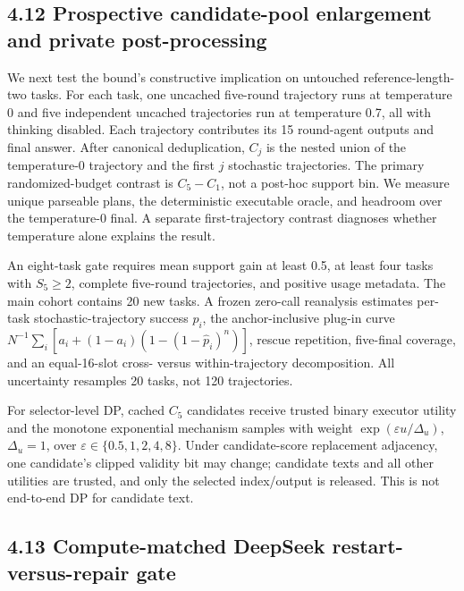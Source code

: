 \documentclass{article}
\begin{document}
\subsection{4.12 Prospective candidate-pool enlargement and private post-processing}

We next test the bound's constructive implication on untouched reference-length-two tasks. For each task, one uncached five-round trajectory runs at temperature 0 and five independent uncached trajectories run at temperature 0.7, all with thinking disabled. Each trajectory contributes its 15 round-agent outputs and final answer. After canonical deduplication, \(C_j\) is the nested union of the temperature-0 trajectory and the first \(j\) stochastic trajectories. The primary randomized-budget contrast is \(C_5-C_1\), not a post-hoc support bin. We measure unique parseable plans, the deterministic executable oracle, and headroom over the temperature-0 final. A separate first-trajectory contrast diagnoses whether temperature alone explains the result.

An eight-task gate requires mean support gain at least 0.5, at least four tasks with \(S_5\ge2\), complete five-round trajectories, and positive usage metadata. The main cohort contains 20 new tasks. A frozen zero-call reanalysis estimates per-task stochastic-trajectory success \(p_i\), the anchor-inclusive plug-in curve \(N^{-1}\sum_i[a_i+(1-a_i)(1-(1-\widehat p_i)^n)]\), rescue repetition, five-final coverage, and an equal-16-slot cross- versus within-trajectory decomposition. All uncertainty resamples 20 tasks, not 120 trajectories.

For selector-level DP, cached \(C_5\) candidates receive trusted binary executor utility and the monotone exponential mechanism samples with weight \(\exp(\varepsilon u/\Delta_u)\), \(\Delta_u=1\), over \(\varepsilon\in\{0.5,1,2,4,8\}\). Under candidate-score replacement adjacency, one candidate's clipped validity bit may change; candidate texts and all other utilities are trusted, and only the selected index/output is released. This is not end-to-end DP for candidate text.

\subsection{4.13 Compute-matched DeepSeek restart-versus-repair gate}
\end{document}

